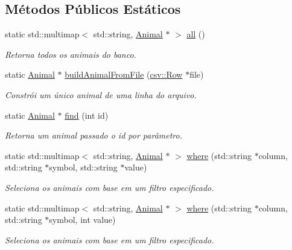 \subsection*{Métodos Públicos Estáticos}
\begin{DoxyCompactItemize}
\item 
static std\+::multimap$<$ std\+::string, \hyperlink{classAnimal}{Animal} $\ast$ $>$ \hyperlink{classAnimal_a342dd3f74afeeadd169e792db6f04845}{all} ()
\begin{DoxyCompactList}\small\item\em Retorna todos os animais do banco. \end{DoxyCompactList}\item 
static \hyperlink{classAnimal}{Animal} $\ast$ \hyperlink{classAnimal_a8b0e3217c72fa8de0316828c6385dd99}{build\+Animal\+From\+File} (\hyperlink{classcsv_1_1Row}{csv\+::\+Row} $\ast$file)
\begin{DoxyCompactList}\small\item\em Constrói um único animal de uma linha do arquivo. \end{DoxyCompactList}\item 
static \hyperlink{classAnimal}{Animal} $\ast$ \hyperlink{classAnimal_aac52a938d9c55280467c9f6e9564df95}{find} (int id)
\begin{DoxyCompactList}\small\item\em Retorna um animal passado o id por parâmetro. \end{DoxyCompactList}\item 
static std\+::multimap$<$ std\+::string, \hyperlink{classAnimal}{Animal} $\ast$ $>$ \hyperlink{classAnimal_a42e0c72ec2c9881cbf5d1be57c418cc5}{where} (std\+::string $\ast$column, std\+::string $\ast$symbol, std\+::string $\ast$value)
\begin{DoxyCompactList}\small\item\em Seleciona os animais com base em um filtro especificado. \end{DoxyCompactList}\item 
static std\+::multimap$<$ std\+::string, \hyperlink{classAnimal}{Animal} $\ast$ $>$ \hyperlink{classAnimal_a82f0fbbdb2064d8235e9037e48f706b3}{where} (std\+::string $\ast$column, std\+::string $\ast$symbol, int value)
\begin{DoxyCompactList}\small\item\em Seleciona os animais com base em um filtro especificado. \end{DoxyCompactList}\end{DoxyCompactItemize}
